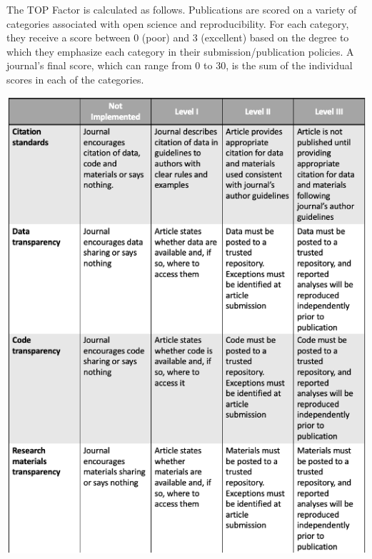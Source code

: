 \documentclass[12pt,twoside]{reedthesis}
\begin{document}
The TOP Factor is calculated as follows. Publications are scored on a
variety of categories associated with open science and reproducibility.
For each category, they receive a score between 0 (poor) and 3
(excellent) based on the degree to which they emphasize each category in
their submission/publication policies. A journal's final score, which
can range from 0 to 30, is the sum of the individual scores in each of
the categories.
\begin{center}\includegraphics[width=1\linewidth]{figure/top-1} \end{center}
\end{document}
